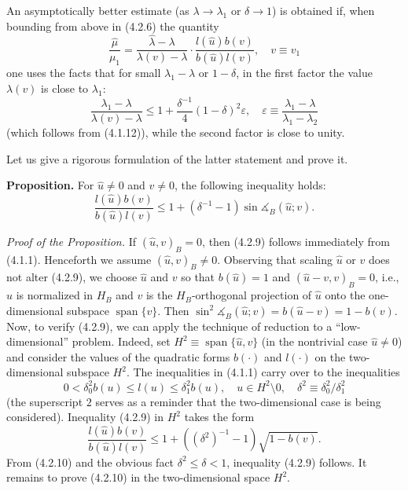 \documentclass[11pt,oneside]{book}
\newcommand{\myspan}{\operatorname{span}}
\newcommand{\ang}{\measuredangle}
\begin{document}
An asymptotically better estimate (as $\lambda \to \lambda_1$ or $\delta \to 1$) is obtained if, when bounding from above in (4.2.6) the quantity
\[
\frac{\hat{\mu}}{\mu_1} = \frac{\hat{\lambda} - \lambda}{\lambda(v) - \lambda} \cdot \frac{l(\hat{u}) b(v)}{b(\hat{u}) l(v)}, \quad v \equiv v_1
\]
one uses the facts that for small $\lambda_1 - \lambda$ or $1 - \delta$, in the first factor the value $\lambda(v)$ is close to $\lambda_1$:
\[
\frac{\lambda_1 - \lambda}{\lambda(v) - \lambda} \leqslant 1 + \frac{\delta^{-1}}{4} (1 - \delta)^2 \varepsilon, \quad \varepsilon \equiv \frac{\lambda_1 - \lambda}{\lambda_1 - \lambda_2} \tag{4.2.8}
\]
(which follows from (4.1.12)), while the second factor is close to unity.

Let us give a rigorous formulation of the latter statement and prove it.

\textbf{Proposition.} For $\hat{u} \neq 0$ and $v \neq 0$, the following inequality holds:
\[
\frac{l(\hat{u}) b(v)}{b(\hat{u}) l(v)} \leqslant 1 + (\delta^{-1} - 1) \sin \ang_B (\hat{u}; v). \tag{4.2.9}
\]

\textit{Proof of the Proposition.} If $(\hat{u}, v)_B = 0$, then (4.2.9) follows immediately from (4.1.1). Henceforth we assume $(\hat{u}, v)_B \neq 0$. Observing that scaling $\hat{u}$ or $v$ does not alter (4.2.9), we choose $\hat{u}$ and $v$ so that $b(\hat{u}) = 1$ and $(\hat{u} - v, v)_B = 0$, i.e., $\hat{u}$ is normalized in $H_B$ and $v$ is the $H_B$-orthogonal projection of $\hat{u}$ onto the one-dimensional subspace $\myspan\{v\}$. Then $\sin^2 \ang_B (\hat{u}; v) = b(\hat{u} - v) = 1 - b(v)$. Now, to verify (4.2.9), we can apply the technique of reduction to a ``low-dimensional'' problem. Indeed, set $H^2 \equiv \myspan\{\hat{u}, v\}$ (in the nontrivial case $\hat{u} \neq 0$) and consider the values of the quadratic forms $b(\cdot)$ and $l(\cdot)$ on the two-dimensional subspace $H^2$. The inequalities in (4.1.1) carry over to the inequalities %
\[
0 < \delta_0^2 b(u) \leqslant l(u) \leqslant \delta_1^2 b(u), \quad u \in H^2 \setminus 0, \quad \delta^2 \equiv \delta_0^2 / \delta_1^2
\]
(the superscript $2$ serves as a reminder that the two-dimensional case is being considered). Inequality (4.2.9) in $H^2$ takes the form
\[
\frac{l(\hat{u}) b(v)}{b(\hat{u}) l(v)} \leqslant 1 + ((\delta^2)^{-1} - 1) \sqrt{1 - b(v)}. \tag{4.2.10}
\]
From (4.2.10) and the obvious fact $\delta^2 \leqslant \delta < 1$, inequality (4.2.9) follows. It remains to prove (4.2.10) in the two-dimensional space $H^2$. %
\end{document}
